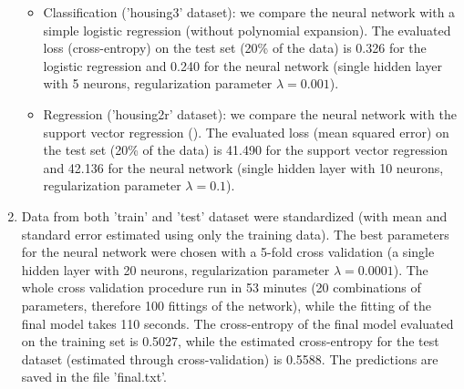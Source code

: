 \documentclass[twocolumn]{article}
\begin{document}
\begin{enumerate}
\begin{itemize}
            \item Classification ('housing3' dataset): we compare the neural network with a simple logistic regression (without polynomial expansion). The evaluated loss (cross-entropy) on the test set (20\% of the data) is 0.326 for the logistic regression and 0.240 for the neural network (single hidden layer with 5 neurons, regularization parameter $\lambda = 0.001$).
            \item Regression ('housing2r' dataset): we compare the neural network with the support vector regression (). The evaluated loss (mean squared error) on the test set (20\% of the data) is 41.490 for the support vector regression and 42.136 for the neural network (single hidden layer with 10 neurons, regularization parameter $\lambda = 0.1$).
        \end{itemize}
    \item Data from both 'train' and 'test' dataset were standardized (with mean and standard error estimated using only the training data). The best parameters for the neural network were chosen with a 5-fold cross validation (a single hidden layer with 20 neurons, regularization parameter $\lambda = 0.0001$). The whole cross validation procedure run in 53 minutes (20 combinations of parameters, therefore 100 fittings of the network), while the fitting of the final model takes 110 seconds. The cross-entropy of the final model evaluated on the training set is 0.5027, while the estimated cross-entropy for the test dataset (estimated through cross-validation) is 0.5588. The predictions are saved in the file 'final.txt'.
\end{enumerate}
\end{document}
